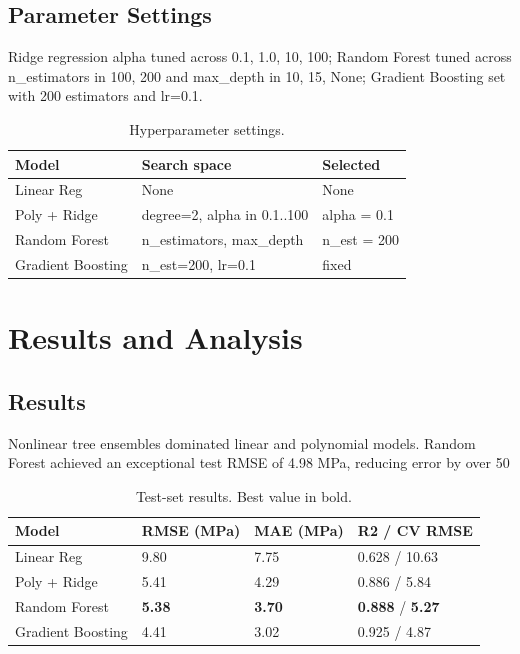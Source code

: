 \documentclass[conference]{IEEEtran}
\begin{document}
\subsection{Parameter Settings}
Ridge regression alpha tuned across {0.1, 1.0, 10, 100}; Random Forest tuned across n_estimators in {100, 200} and max_depth in {10, 15, None}; Gradient Boosting set with 200 estimators and lr=0.1.

\begin{table}[htbp]
\caption{Hyperparameter settings.}
\label{tab:hyperparameters}
\centering
\begin{tabular}{lll}
\toprule
\textbf{Model} & \textbf{Search space} & \textbf{Selected} \\
\midrule
Linear Reg & None & None \\
Poly + Ridge & degree=2, alpha in {0.1..100} & alpha = 0.1 \\
Random Forest & n\_estimators, max\_depth & n\_est = 200 \\
Gradient Boosting & n\_est=200, lr=0.1 & fixed \\
\bottomrule
\end{tabular}
\end{table}

\section{Results and Analysis}
\subsection{Results}
Nonlinear tree ensembles dominated linear and polynomial models. Random Forest achieved an exceptional test RMSE of 4.98 MPa, reducing error by over 50%

\begin{table}[htbp]
\caption{Test-set results. Best value in bold.}
\label{tab:results}
\centering
\begin{tabular}{llll}
\toprule
\textbf{Model} & \textbf{RMSE (MPa)} & \textbf{MAE (MPa)} & \textbf{R2 / CV RMSE} \\
\midrule
Linear Reg & 9.80 & 7.75 & 0.628 / 10.63 \\
Poly + Ridge & 5.41 & 4.29 & 0.886 / 5.84 \\
Random Forest & \textbf{5.38} & \textbf{3.70} & \textbf{0.888} / \textbf{5.27} \\
Gradient Boosting & 4.41 & 3.02 & 0.925 / 4.87 \\
\bottomrule
\end{tabular}
\end{table}
\end{document}

